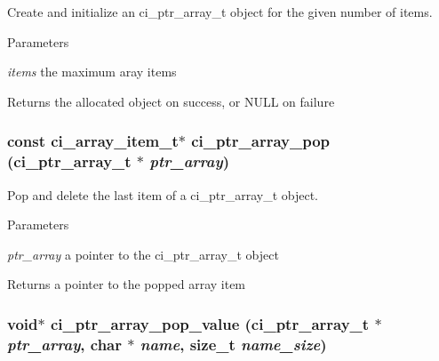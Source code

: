 Create and initialize an ci\_\-ptr\_\-array\_\-t object for the given number of items. 
\begin{DoxyParams}{Parameters}
\item[{\em items}]the maximum aray items \end{DoxyParams}
\begin{DoxyReturn}{Returns}
the allocated object on success, or NULL on failure 
\end{DoxyReturn}
\hypertarget{group__PTR__ARRAYS_gaca1303a4e9fe24620879cdb0e5cbfa67}{
\subsubsection[{ci\_\-ptr\_\-array\_\-pop}]{\setlength{\rightskip}{0pt plus 5cm}const ci\_\-array\_\-item\_\-t$\ast$ ci\_\-ptr\_\-array\_\-pop ({\bf ci\_\-ptr\_\-array\_\-t} $\ast$ {\em ptr\_\-array})}}
\label{group__PTR__ARRAYS_gaca1303a4e9fe24620879cdb0e5cbfa67}


Pop and delete the last item of a ci\_\-ptr\_\-array\_\-t object. 
\begin{DoxyParams}{Parameters}
\item[{\em ptr\_\-array}]a pointer to the ci\_\-ptr\_\-array\_\-t object \end{DoxyParams}
\begin{DoxyReturn}{Returns}
a pointer to the popped array item 
\end{DoxyReturn}
\hypertarget{group__PTR__ARRAYS_ga91642fd37d3b991079414228b795fa8f}{
\subsubsection[{ci\_\-ptr\_\-array\_\-pop\_\-value}]{\setlength{\rightskip}{0pt plus 5cm}void$\ast$ ci\_\-ptr\_\-array\_\-pop\_\-value ({\bf ci\_\-ptr\_\-array\_\-t} $\ast$ {\em ptr\_\-array}, \/  char $\ast$ {\em name}, \/  size\_\-t {\em name\_\-size})}}
\label{group__PTR__ARRAYS_ga91642fd37d3b991079414228b795fa8f}


